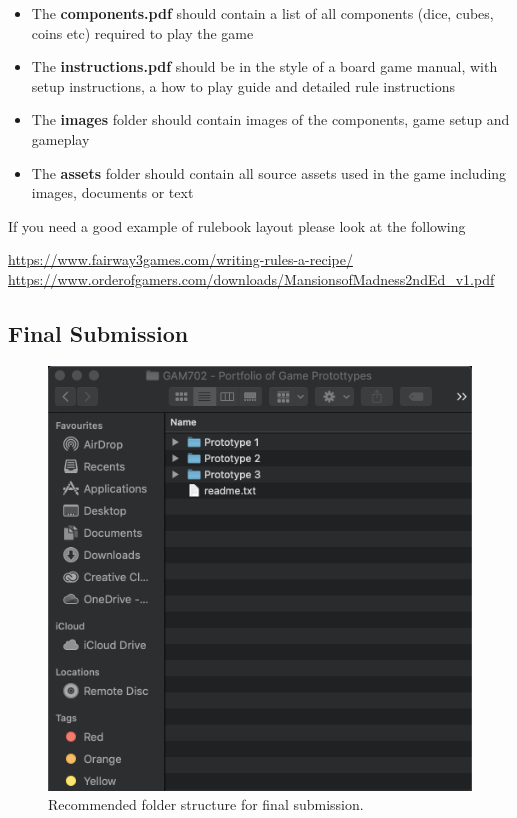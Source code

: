 \documentclass{../../fal_assignment}
\begin{document}
\begin{itemize}
	\item The \textbf{components.pdf} should contain a list of all components (dice, cubes, coins etc) required to play the game
	\item The \textbf{instructions.pdf} should be in the style of a board game manual, with setup instructions, a how to play guide and detailed rule instructions
	\item The \textbf{images} folder should contain images of the components, game setup and gameplay
	\item The \textbf{assets} folder should contain all source assets used in the game including images, documents or text
\end{itemize}

If you need a good example of rulebook layout please look at the following

\url{https://www.fairway3games.com/writing-rules-a-recipe/}
\url{https://www.orderofgamers.com/downloads/MansionsofMadness2ndEd_v1.pdf}

\pagebreak
\subsection*{Final Submission} 

\begin{figure}[H]
	\begin{center}
		\includegraphics[height=0.4\textheight]{portfolio_folder_structure}
	\end{center}
	\caption{Recommended folder structure for final submission.}
	\label{fig:portfolio_folder_structure}
\end{figure}
\end{document}
